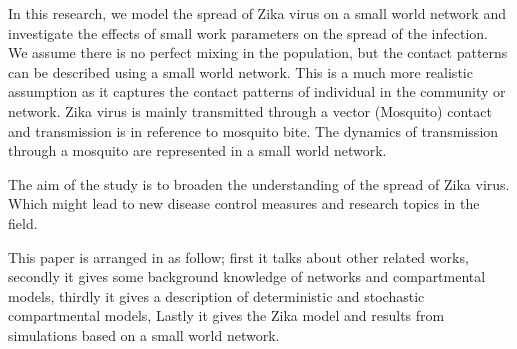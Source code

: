 In this research, we model the spread of Zika virus on a small world network and investigate the effects of small work parameters on the spread of the infection. We assume there is no perfect mixing in the population, but the contact patterns can be described using a small world network. This is a much more realistic assumption as it captures the contact patterns of individual
in the community or network.
Zika virus is mainly transmitted through a vector (Mosquito)
contact and transmission is in reference to mosquito bite. The dynamics of transmission through a mosquito are represented in a small world network.

The aim of the study is to broaden the understanding of the spread of Zika virus. Which might
lead to new disease control measures and research topics in the field.

This paper is arranged in as follow;
first it talks about other related works, secondly it gives some background knowledge of networks and compartmental models, thirdly it gives a description of deterministic and stochastic compartmental models, Lastly
it gives the Zika model and results from simulations based on a small world network.
